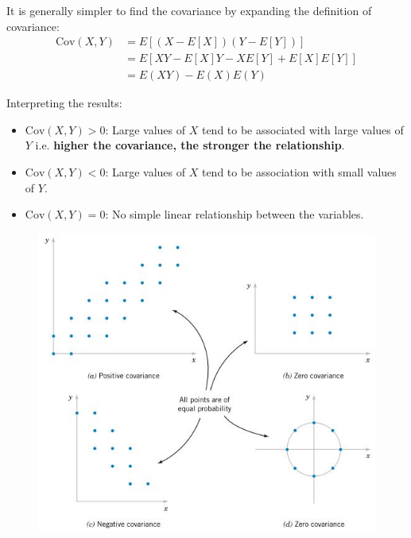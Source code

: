 \documentclass[10pt,a4paper]{article}
\begin{document}
\begin{tcolorbox}[breakable,colback=white]
    It is generally simpler to find the covariance by expanding the definition of covariance:
    \begin{align*}
        \text{Cov}(X,Y) &=  E[(X-E[X])(Y-E[Y])] \\
        &= E[XY-E[X]Y-XE[Y]+E[X]E[Y]] \\
        &= E(XY) - E(X)E(Y) 
    \end{align*}
\end{tcolorbox}

Interpreting the results:
\begin{itemize}
    \item $\text{Cov}(X,Y)>0$: Large values of $X$ tend to be associated with large values of $Y$
    i.e. \textbf{higher the covariance, the stronger the relationship}.
    \item $\text{Cov}(X,Y)<0$: Large values of $X$ tend to be association with small values of $Y$.
    \item $\text{Cov}(X,Y)=0$: No simple linear relationship between the variables.
\end{itemize}
\begin{figure} [h!]
    \centering
    \includegraphics[scale=0.56]{covariance_type.JPG}
\end{figure}
\end{document}
